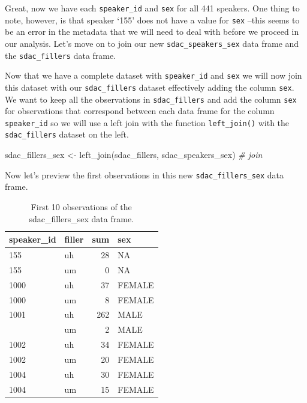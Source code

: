 \documentclass[
  letterpaper,
]{scrbook}
\newenvironment{Shaded}{\begin{snugshade}}{\end{snugshade}}
\newcommand{\CommentTok}[1]{\textcolor[rgb]{0.00,0.00,0.00}{\textit{#1}}}
\newcommand{\FunctionTok}[1]{\textcolor[rgb]{0.00,0.00,0.00}{#1}}
\newcommand{\NormalTok}[1]{\textcolor[rgb]{0.00,0.00,0.00}{#1}}
\newcommand{\OtherTok}[1]{\textcolor[rgb]{0.00,0.00,0.00}{#1}}
\begin{document}
Great, now we have each \texttt{speaker\_id} and \texttt{sex} for all
441 speakers. One thing to note, however, is that speaker `155' does not
have a value for \texttt{sex} --this seems to be an error in the
metadata that we will need to deal with before we proceed in our
analysis. Let's move on to join our new \texttt{sdac\_speakers\_sex}
data frame and the \texttt{sdac\_fillers} data frame.

Now that we have a complete dataset with \texttt{speaker\_id} and
\texttt{sex} we will now join this dataset with our
\texttt{sdac\_fillers} dataset effectively adding the column
\texttt{sex}. We want to keep all the observations in
\texttt{sdac\_fillers} and add the column \texttt{sex} for observations
that correspond between each data frame for the column
\texttt{speaker\_id} so we will use a left join with the function
\texttt{left\_join()} with the \texttt{sdac\_fillers} dataset on the
left.

\begin{Shaded}
\begin{Highlighting}[]
\NormalTok{sdac\_fillers\_sex }\OtherTok{\textless{}{-}} 
  \FunctionTok{left\_join}\NormalTok{(sdac\_fillers, sdac\_speakers\_sex) }\CommentTok{\# join}
\end{Highlighting}
\end{Shaded}

Now let's preview the first observations in this new
\texttt{sdac\_fillers\_sex} data frame.

\hypertarget{tbl-i-multi-cont-sdac-fillers-sex-preview}{}
\begin{table}
\caption{\label{tbl-i-multi-cont-sdac-fillers-sex-preview}First 10 observations of the sdac\_fillers\_sex data frame. }\tabularnewline

\centering
\begin{tabular}{llrl}
\toprule
speaker\_id & filler & sum & sex\\
\midrule
155 & uh & 28 & NA\\
155 & um & 0 & NA\\
1000 & uh & 37 & FEMALE\\
1000 & um & 8 & FEMALE\\
1001 & uh & 262 & MALE\\
\addlinespace
1001 & um & 2 & MALE\\
1002 & uh & 34 & FEMALE\\
1002 & um & 20 & FEMALE\\
1004 & uh & 30 & FEMALE\\
1004 & um & 15 & FEMALE\\
\bottomrule
\end{tabular}
\end{table}
\end{document}
